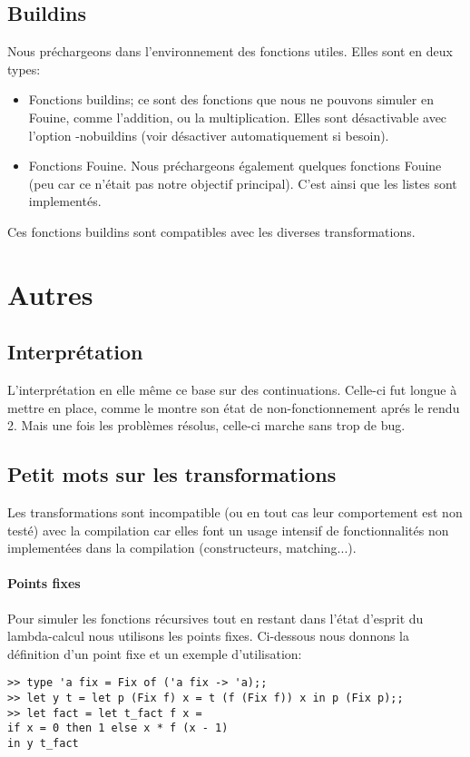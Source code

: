 \documentclass[paper=a4, fontsize=11pt, twocolumn]{article}
\begin{document}
\subsection{Buildins}
Nous préchargeons dans l'environnement des fonctions utiles. Elles sont en deux types:
\begin{itemize}
	\item Fonctions buildins; ce sont des fonctions que nous ne pouvons  simuler en Fouine, comme l'addition, ou la multiplication. Elles sont désactivable avec l'option -nobuildins (voir désactiver automatiquement si besoin).
	\item Fonctions Fouine. Nous préchargeons également quelques fonctions Fouine (peu car ce n'était pas notre objectif principal). C'est ainsi que les listes sont implementés.
\end{itemize}
Ces fonctions buildins sont compatibles avec les diverses transformations.


\section{Autres}
\subsection{Interprétation}
L'interprétation en elle même ce base sur des continuations. Celle-ci fut longue à mettre en place, comme le montre son état de non-fonctionnement aprés le rendu 2. Mais une fois les problèmes résolus, celle-ci marche sans trop de bug.
\subsection{Petit mots sur les transformations}
Les transformations sont incompatible (ou en tout cas leur comportement est non testé) avec la compilation car elles font un usage intensif de fonctionnalités non implementées dans la compilation (constructeurs, matching...).

\paragraph{Points fixes} \label{pointsfixes}
Pour simuler les fonctions récursives tout en restant dans l'état d'esprit du lambda-calcul nous utilisons les points fixes. Ci-dessous nous donnons la définition d'un point fixe et un exemple d'utilisation:

\begin{verbatim}
>> type 'a fix = Fix of ('a fix -> 'a);;
>> let y t = let p (Fix f) x = t (f (Fix f)) x in p (Fix p);;
>> let fact = let t_fact f x = 
if x = 0 then 1 else x * f (x - 1) 
in y t_fact
\end{verbatim}
\end{document}
